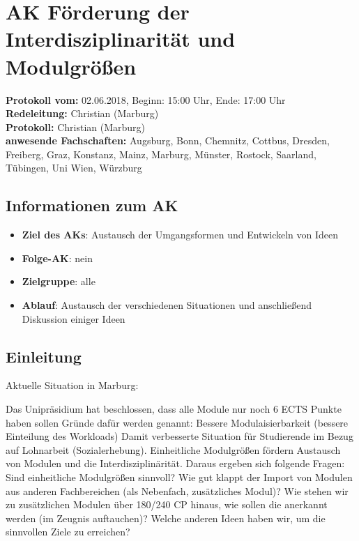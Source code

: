 
\section{AK Förderung der Interdisziplinarität und Modulgrößen}

  \textbf{Protokoll vom:} 02.06.2018,
  Beginn: 15:00 Uhr,
  Ende: 17:00 Uhr \\
  \textbf{Redeleitung:} Christian (Marburg) \\
  \textbf{Protokoll:} Christian (Marburg) \\
  \textbf{anwesende Fachschaften:} Augsburg, Bonn, Chemnitz, Cottbus, Dresden, Freiberg, Graz, Konstanz, Mainz, Marburg, Münster, Rostock, Saarland, Tübingen, Uni Wien, Würzburg

  \subsection*{Informationen zum AK}
    \begin{itemize}
      \item \textbf{Ziel des AKs}: Austausch der Umgangsformen und Entwickeln von Ideen
      \item \textbf{Folge-AK}: nein
      \item \textbf{Zielgruppe}: alle
      \item \textbf{Ablauf}: Austausch der verschiedenen Situationen und anschließend Diskussion einiger Ideen
    \end{itemize}

  \subsection*{Einleitung}
    Aktuelle Situation in Marburg:
    \begin{outline}
      \1 Das Unipräsidium hat beschlossen, dass alle Module nur noch 6 ECTS Punkte haben sollen
      \1 Gründe dafür werden genannt:
        \2 Bessere Modulaisierbarkeit (bessere Einteilung des Workloads)
        \2 Damit verbesserte Situation für Studierende im Bezug auf Lohnarbeit (Sozialerhebung).
        \2 Einheitliche Modulgrößen fördern Austausch von Modulen und die Interdisziplinärität.
      \1 Daraus ergeben sich folgende Fragen:
        \2 Sind einheitliche Modulgrößen sinnvoll?
        \2 Wie gut klappt der Import von Modulen aus anderen Fachbereichen (als Nebenfach, zusätzliches Modul)?
        \2 Wie stehen wir zu zusätzlichen Modulen über 180/240 CP hinaus, wie sollen die anerkannt werden (im Zeugnis auftauchen)?
        \2 Welche anderen Ideen haben wir, um die sinnvollen Ziele zu erreichen?
    \end{outline}

